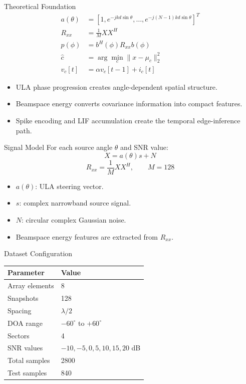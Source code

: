 \documentclass[aspectratio=169]{beamer}
\begin{document}
\begin{frame}{Theoretical Foundation}
\small
\begin{align*}
    a(\theta) &= [1,e^{-jkd\sin\theta},\ldots,e^{-j(N-1)kd\sin\theta}]^{T} \\
    R_{xx} &= \frac{1}{M}XX^{H} \\
    p(\phi) &= b^{H}(\phi)R_{xx}b(\phi) \\
    \hat{c} &= \arg\min_c \lVert x-\mu_c\rVert_2^2 \\
    v_c[t] &= \alpha v_c[t-1]+i_c[t]
\end{align*}
\vspace{-0.1cm}
\begin{itemize}
    \item ULA phase progression creates angle-dependent spatial structure.
    \item Beamspace energy converts covariance information into compact features.
    \item Spike encoding and LIF accumulation create the temporal edge-inference path.
\end{itemize}
\end{frame}

\begin{frame}{Signal Model}
For each source angle $\theta$ and SNR value:
\begin{equation*}
    X = a(\theta)s + N
\end{equation*}
\begin{equation*}
    R_{xx}=\frac{1}{M}XX^{H}, \qquad M=128
\end{equation*}
\begin{itemize}
    \item $a(\theta)$: ULA steering vector.
    \item $s$: complex narrowband source signal.
    \item $N$: circular complex Gaussian noise.
    \item Beamspace energy features are extracted from $R_{xx}$.
\end{itemize}
\end{frame}

\begin{frame}{Dataset Configuration}
\centering
\begin{tabular}{ll}
\toprule
Parameter & Value \\
\midrule
Array elements & 8 \\
Snapshots & 128 \\
Spacing & $\lambda/2$ \\
DOA range & $-60^{\circ}$ to $+60^{\circ}$ \\
Sectors & 4 \\
SNR values & $-10,-5,0,5,10,15,20$ dB \\
Total samples & 2800 \\
Test samples & 840 \\
\bottomrule
\end{tabular}
\end{frame}
\end{document}
